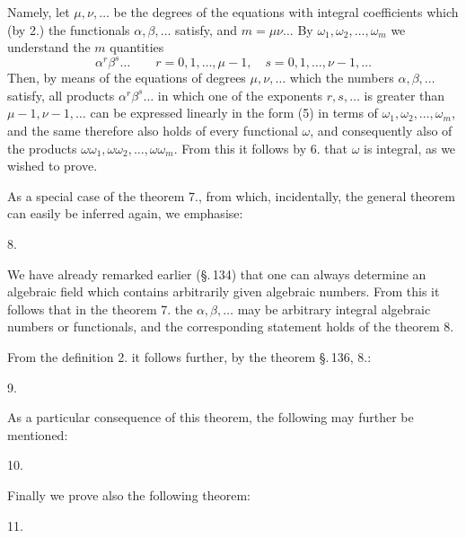 Namely, let $\mu, \nu, \ldots$ be the degrees of the equations with integral coefficients which (by 2.) the functionals $\alpha, \beta, \ldots$ satisfy, and $m=\mu\nu\ldots$ By $\omega_1, \omega_2, \ldots, \omega_m$ we understand the $m$ quantities
\[
\alpha^r\beta^s\ldots \qquad r=0,1,\ldots,\mu-1, \quad s=0,1,\ldots,\nu-1, \ldots
\]
Then, by means of the equations of degrees $\mu, \nu, \ldots$ which the numbers $\alpha, \beta, \ldots$ satisfy, all products $\alpha^r\beta^s\ldots$ in which one of the exponents $r, s, \ldots$ is greater than $\mu-1, \nu-1, \ldots$ can be expressed linearly in the form (5) in terms of $\omega_1, \omega_2, \ldots, \omega_m$, and the same therefore also holds of every functional $\omega$, and consequently also of the products $\omega\omega_1, \omega\omega_2, \ldots, \omega\omega_m$. From this it follows by 6. that $\omega$ is integral, as we wished to prove.

As a special case of the theorem 7., from which, incidentally, the general theorem can easily be inferred again, we emphasise:

8. 

We have already remarked earlier (§.\,134) that one can always determine an algebraic field which contains arbitrarily given algebraic numbers. From this it follows that in the theorem 7. the $\alpha, \beta, \ldots$ may be arbitrary integral algebraic numbers or functionals, and the corresponding statement holds of the theorem 8.

From the definition 2. it follows further, by the theorem §.\,136, 8.:

9. 

As a particular consequence of this theorem, the following may further be mentioned:

10. 

Finally we prove also the following theorem:

11. 
